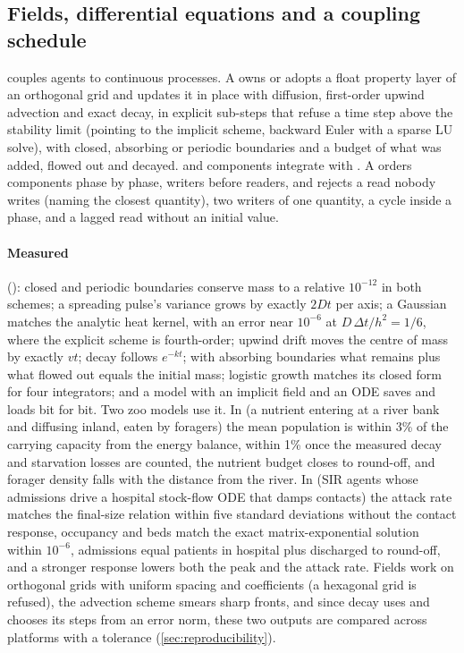 \subsection{Fields, differential equations and a coupling schedule}
\label{sec:couple}

 couples agents to continuous processes. A  owns or adopts a
float property layer of an orthogonal grid and updates it in place with diffusion, first-order
upwind advection and exact decay, in explicit sub-steps that refuse a time step above the
stability limit (pointing to the implicit scheme, backward Euler with a sparse LU solve), with
closed, absorbing or periodic boundaries and a budget of what was added, flowed out and
decayed.  and  components integrate with . A
 orders components phase by phase, writers before readers, and 
rejects a read nobody writes (naming the closest quantity), two writers of one quantity, a
cycle inside a phase, and a lagged read without an initial value.

\paragraph{Measured} (): closed and periodic boundaries conserve mass to a
relative $10^{-12}$ in both schemes; a spreading pulse's variance grows by exactly $2Dt$ per
axis; a Gaussian matches the analytic heat kernel, with an error near $10^{-6}$ at $D\,\Delta
t/h^2 = 1/6$, where the explicit scheme is fourth-order; upwind drift moves the centre of mass
by exactly $vt$; decay follows $e^{-kt}$; with absorbing boundaries what remains plus what
flowed out equals the initial mass; logistic growth matches its closed form for four
integrators; and a model with an implicit field and an ODE saves and loads bit for bit. Two
zoo models use it. In  (a nutrient entering at a river bank and
diffusing inland, eaten by foragers) the mean population is within 3\% of the carrying
capacity from the energy balance, within 1\% once the measured decay and starvation losses
are counted, the nutrient budget closes to round-off, and forager density falls with the
distance from the river. In  (SIR agents whose admissions drive a
hospital stock-flow ODE that damps contacts) the attack rate matches the final-size relation
within five standard deviations without the contact response, occupancy and beds match the
exact matrix-exponential solution within $10^{-6}$, admissions equal patients in hospital plus
discharged to round-off, and a stronger response lowers both the peak and the attack rate.
Fields work on orthogonal grids with uniform spacing and coefficients (a hexagonal grid is
refused), the advection scheme smears sharp fronts, and since decay uses  and
 chooses its steps from an error norm, these two outputs are compared across
platforms with a tolerance (\cref{sec:reproducibility}).

